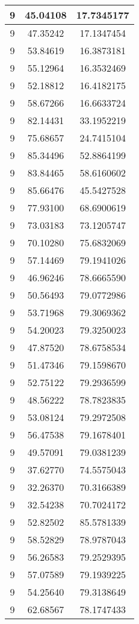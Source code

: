 \documentclass[
]{book}
\begin{document}
\begin{tabular}{c|c|c}
\hline
9 & 45.04108 & 17.7345177\\
\hline
9 & 47.35242 & 17.1347454\\
\hline
9 & 53.84619 & 16.3873181\\
\hline
9 & 55.12964 & 16.3532469\\
\hline
9 & 52.18812 & 16.4182175\\
\hline
9 & 58.67266 & 16.6633724\\
\hline
9 & 82.14431 & 33.1952219\\
\hline
9 & 75.68657 & 24.7415104\\
\hline
9 & 85.34496 & 52.8864199\\
\hline
9 & 83.84465 & 58.6160602\\
\hline
9 & 85.66476 & 45.5427528\\
\hline
9 & 77.93100 & 68.6900619\\
\hline
9 & 73.03183 & 73.1205747\\
\hline
9 & 70.10280 & 75.6832069\\
\hline
9 & 57.14469 & 79.1941026\\
\hline
9 & 46.96246 & 78.6665590\\
\hline
9 & 50.56493 & 79.0772986\\
\hline
9 & 53.71968 & 79.3069362\\
\hline
9 & 54.20023 & 79.3250023\\
\hline
9 & 47.87520 & 78.6758534\\
\hline
9 & 51.47346 & 79.1598670\\
\hline
9 & 52.75122 & 79.2936599\\
\hline
9 & 48.56222 & 78.7823835\\
\hline
9 & 53.08124 & 79.2972508\\
\hline
9 & 56.47538 & 79.1678401\\
\hline
9 & 49.57091 & 79.0381239\\
\hline
9 & 37.62770 & 74.5575043\\
\hline
9 & 32.26370 & 70.3166389\\
\hline
9 & 32.54238 & 70.7024172\\
\hline
9 & 52.82502 & 85.5781339\\
\hline
9 & 58.52829 & 78.9787043\\
\hline
9 & 56.26583 & 79.2529395\\
\hline
9 & 57.07589 & 79.1939225\\
\hline
9 & 54.25640 & 79.3138649\\
\hline
9 & 62.68567 & 78.1747433\\

\end{tabular}
\end{document}
